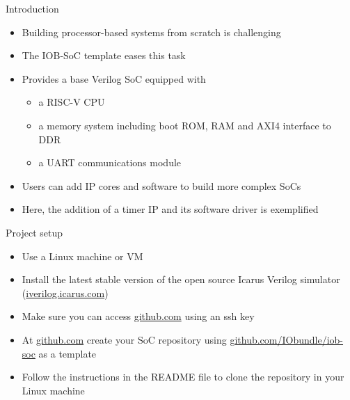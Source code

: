 \documentclass [xcolor=svgnames, t] {beamer}
\begin{document}
\begin{frame}{Introduction}
\begin{center}
    \begin{itemize}
      \item Building processor-based systems from scratch is challenging
      \item The IOB-SoC template eases this task
      \item Provides a base Verilog SoC equipped with
        \begin{itemize}
        \item a RISC-V CPU
        \item a memory system including boot ROM, RAM and AXI4 interface to DDR
        \item a UART communications module
        \end{itemize}
      \item Users can add IP cores and software to build more complex SoCs
      \item Here, the addition of a timer IP and its software driver is exemplified
    \end{itemize}
\end{center}
\end{frame}

\begin{frame}{Project setup}
\begin{center}
  \begin{itemize}
    \item Use a Linux machine or VM
    \item Install the latest stable version of the open source Icarus Verilog simulator (\url{iverilog.icarus.com})
    \item Make sure you can access \url{github.com} using an ssh key
    \item At \url{github.com} create your SoC repository using \url{github.com/IObundle/iob-soc} as a template
    \item Follow the instructions in the README file to clone the repository in your Linux machine
  \end{itemize}
\end{center}
\end{frame}
\end{document}
